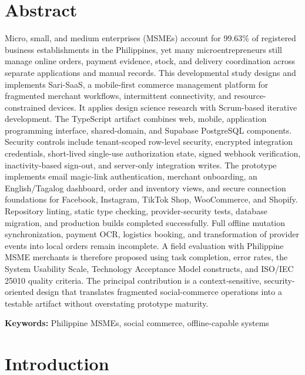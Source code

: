 \documentclass[12pt,oneside]{report}
\begin{document}
\chapter*{Abstract}
Micro, small, and medium enterprises (MSMEs) account for 99.63\% of registered
business establishments in the Philippines, yet many microentrepreneurs still
manage online orders, payment evidence, stock, and delivery coordination across
separate applications and manual records. This developmental study designs and
implements Sari-SaaS, a mobile-first commerce management platform for fragmented
merchant workflows, intermittent connectivity, and resource-constrained
devices. It applies design science research with Scrum-based iterative
development. The TypeScript artifact combines web, mobile, application
programming interface, shared-domain, and Supabase PostgreSQL components.
Security controls include tenant-scoped row-level security, encrypted integration
credentials, short-lived single-use authorization state, signed webhook
verification, inactivity-based sign-out, and server-only integration writes.
The prototype implements email magic-link authentication, merchant onboarding,
an English/Tagalog dashboard, order and inventory views, and secure connection
foundations for Facebook, Instagram, TikTok Shop, WooCommerce, and Shopify.
Repository linting, static type checking, provider-security tests, database
migration, and production builds completed successfully. Full offline mutation
synchronization, payment OCR, logistics booking, and transformation of provider
events into local orders remain incomplete. A field evaluation with Philippine
MSME merchants is therefore proposed using task completion, error rates, the
System Usability Scale, Technology Acceptance Model constructs, and ISO/IEC
25010 quality criteria. The principal contribution is a context-sensitive,
security-oriented design that translates fragmented social-commerce operations
into a testable artifact without overstating prototype maturity.

\noindent\textbf{Keywords:} Philippine MSMEs, social commerce, offline-capable
systems

\tableofcontents
\listoftables
\listoffigures
\clearpage
{}

\chapter{Introduction}
\end{document}
